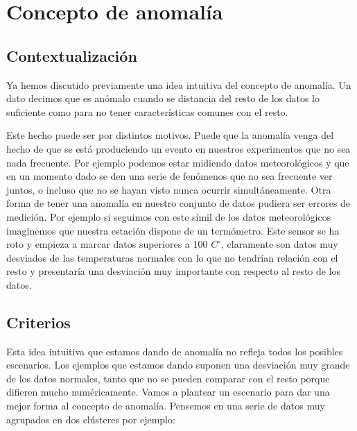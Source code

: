 \chapter{Concepto de anomalía}
\label{chapter:anomalia}

\section{Contextualización}

Ya hemos discutido previamente una idea intuitiva del concepto de anomalía. Un dato decimos que es anómalo cuando se distancia del resto de los datos lo suficiente como para no tener características comunes con el resto.

Este hecho puede ser por distintos motivos. Puede que la anomalía venga del hecho de que se está produciendo un evento en nuestros experimentos que no sea nada frecuente. Por ejemplo podemos estar midiendo datos meteorológicos y que en un momento dado se den una serie de fenómenos que no sea frecuente ver juntos, o incluso que no se hayan visto nunca ocurrir simultáneamente. Otra forma de tener una anomalía en nuestro conjunto de datos pudiera ser errores de medición. Por ejemplo si seguimos con este símil de los datos meteorológicos imaginemos que nuestra estación dispone de un termómetro. Este sensor se ha roto y empieza a marcar datos superiores a 100 $C^\circ$, claramente son datos muy desviados de las temperaturas normales con lo que no tendrían relación con el resto y presentaría una desviación muy importante con respecto al resto de los datos.

\section{Criterios}

Esta idea intuitiva que estamos dando de anomalía no refleja todos los posibles escenarios. Los ejemplos que estamos dando suponen una desviación muy grande de los datos normales, tanto que no se pueden comparar con el resto porque difieren mucho numéricamente. Vamos a plantear un escenario para dar una mejor forma al concepto de anomalía. Pensemos en una serie de datos muy agrupados en dos clústeres por ejemplo:

